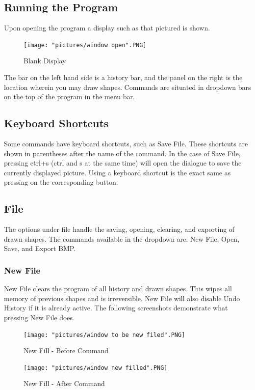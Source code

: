 \documentclass[12pt]{article} %
\begin{document}
\subsection{Running the Program}
Upon opening the program a display such as that pictured is shown. 

\begin{figure}[hbtp]
\caption{Blank Display}
\centering
\texttt{[image: "pictures/window open".PNG]}
\end{figure}


The bar on the left hand side is a history bar, and the panel on the right is the location wherein you may draw shapes. Commands are situated in dropdown bars on the top of the program in the menu bar. 

\subsection{Keyboard Shortcuts}
Some commands have keyboard shortcuts, such as Save File. These shortcuts are shown in parentheses after the name of the command. In the case of Save File, pressing ctrl+s (ctrl and s at the same time) will open the dialogue to save the currently displayed picture. Using a keyboard shortcut is the exact same as pressing on the corresponding button.

\subsection{File}
The options under file handle the saving, opening, clearing, and exporting of drawn shapes. The commands available in the dropdown are: New File, Open, Save, and Export BMP.

\subsubsection{New File}
New File clears the program of all history and drawn shapes. This wipes all memory of previous shapes and is irreversible. New File will also disable Undo History if it is already active. The following screenshots demonstrate what pressing New File does.

\begin{figure}[hbtp]
\caption{New Fill - Before Command}
\centering
\texttt{[image: "pictures/window to be new filed".PNG]}
\end{figure}

\begin{figure}[hbtp]
\caption{New Fill - After Command}
\centering
\texttt{[image: "pictures/window new filled".PNG]}
\end{figure}
\end{document}
